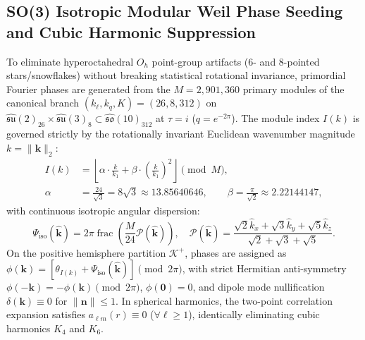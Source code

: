 \documentclass[11pt]{article}
\theoremstyle{plain}
\begin{document}
\subsection{SO(3) Isotropic Modular Weil Phase Seeding and Cubic Harmonic Suppression}
\label{app:so3-isotropic-weil-seeding}
\label{app:metaplectic_weil_phases}
To eliminate hyperoctahedral $O_h$ point-group artifacts (6- and 8-pointed stars/snowflakes) without breaking statistical rotational invariance, primordial Fourier phases are generated from the $M = 2{,}901{,}360$ primary modules of the canonical branch $(k_\ell, k_q, K) = (26, 8, 312)$ on $\widehat{\mathfrak{su}}(2)_{26} \times \widehat{\mathfrak{su}}(3)_8 \subset \widehat{\mathfrak{so}}(10)_{312}$ at $\tau = i$ ($q = e^{-2\pi}$). The module index $I(k)$ is governed strictly by the rotationally invariant Euclidean wavenumber magnitude $k = \|\mathbf{k}\|_2$:
\begin{equation}
\begin{aligned}
I(k) &= \left\lfloor \alpha \cdot \frac{k}{k_1} + \beta \cdot \left(\frac{k}{k_1}\right)^2 \right\rfloor \pmod M, \\
\alpha &= \frac{24}{\sqrt{3}} = 8\sqrt{3} \approx 13.85640646, \qquad \beta = \frac{\pi}{\sqrt{2}} \approx 2.22144147,
\end{aligned}
\end{equation}
with continuous isotropic angular dispersion:
\begin{equation}
\Psi_{\mathrm{iso}}(\hat{\mathbf{k}}) = 2\pi \operatorname{frac}\left( \frac{M}{24} \mathcal{P}(\hat{\mathbf{k}}) \right), \quad \mathcal{P}(\hat{\mathbf{k}}) = \frac{\sqrt{2}\hat{k}_x + \sqrt{3}\hat{k}_y + \sqrt{5}\hat{k}_z}{\sqrt{2} + \sqrt{3} + \sqrt{5}}.
\end{equation}
On the positive hemisphere partition $\mathcal{K}^+$, phases are assigned as $\phi(\mathbf{k}) = [\theta_{I(k)} + \Psi_{\mathrm{iso}}(\hat{\mathbf{k}})] \pmod{2\pi}$, with strict Hermitian anti-symmetry $\phi(-\mathbf{k}) = -\phi(\mathbf{k}) \pmod{2\pi}$, $\phi(\mathbf{0}) = 0$, and dipole mode nullification $\delta(\mathbf{k}) \equiv 0$ for $\|\mathbf{n}\| \le 1$. In spherical harmonics, the two-point correlation expansion satisfies $a_{\ell m}(r) \equiv 0$ ($\forall \ell \ge 1$), identically eliminating cubic harmonics $K_4$ and $K_6$.
\end{document}
